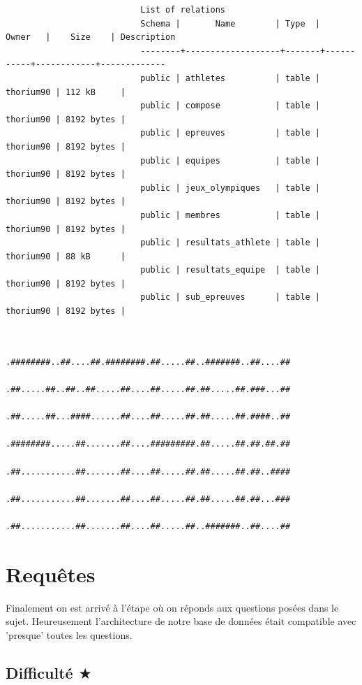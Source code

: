 \documentclass[]{scrreprt}
\begin{document}
			{\footnotesize 	\begin{verbatim}
			               List of relations
			               Schema |       Name        | Type  |   Owner   |    Size    | Description 
			               --------+-------------------+-------+-----------+------------+-------------
			               public | athletes          | table | thorium90 | 112 kB     | 
			               public | compose           | table | thorium90 | 8192 bytes | 
			               public | epreuves          | table | thorium90 | 8192 bytes | 
			               public | equipes           | table | thorium90 | 8192 bytes | 
			               public | jeux_olympiques   | table | thorium90 | 8192 bytes | 
			               public | membres           | table | thorium90 | 8192 bytes | 
			               public | resultats_athlete | table | thorium90 | 88 kB      | 
			               public | resultats_equipe  | table | thorium90 | 8192 bytes | 
			               public | sub_epreuves      | table | thorium90 | 8192 bytes | 
			
			\end{verbatim}
		}
		
		\vspace{2cm}
	
		\begin{center}
			\begin{verbatim}
			                       .########..##....##.########.##.....##..#######..##....##
			                       .##.....##..##..##.....##....##.....##.##.....##.###...##
			                       .##.....##...####......##....##.....##.##.....##.####..##
			                       .########.....##.......##....#########.##.....##.##.##.##
			                       .##...........##.......##....##.....##.##.....##.##..####
			                       .##...........##.......##....##.....##.##.....##.##...###
			                       .##...........##.......##....##.....##..#######..##....##
			\end{verbatim}
		\end{center}
 	\chapter{Requêtes}
 	\label{Chapter5}
	
		{\large 
			Finalement on est arrivé à l'étape où on réponds aux questions posées dans le sujet. Heureusement l'architecture de notre base de données était compatible avec 'presque' toutes les questions.
		}
	
		\section{Difficulté $\bigstar$}
			
\end{document}
